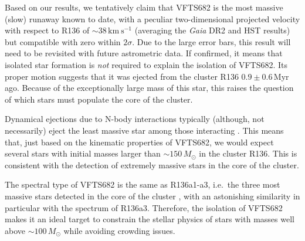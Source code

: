 \documentclass[apjl,twocolumn]{emulateapj}
\newcommand{\kms}{{\,\mathrm{km\ s^{-1}}}}
\begin{document}
Based on our results, we tentatively claim that VFTS682 is the most massive
(slow) runaway known to date, with a peculiar two-dimensional
projected velocity with respect to R136 of
$\sim38\kms$ (averaging the \emph{Gaia} DR2 and HST
results) but compatible with zero within $2\sigma$. Due to the large error bars, this result will need
to be revisited with future astrometric data. %
If confirmed, it means that isolated star formation is
\emph{not} required to explain the isolation of VFTS682. Its proper motion suggests that it was ejected from the cluster R136
$0.9\pm0.6$\,Myr ago. Because of the exceptionally large mass
of this star, this raises the question of which stars must populate
the core of the cluster.

Dynamical ejections due to N-body interactions typically (although, not necessarily) eject the least
massive star among those interacting \cite[e.g.,][]{banerjee:12}. This means that, just
based on the kinematic properties of VFTS682, we would expect several
stars with initial masses larger than $\sim$$150\,M_\odot$ in the
cluster R136.
This is consistent with the detection
of extremely massive stars in the core of the
cluster. %

The spectral type of VFTS682
\citep[WNh5,][]{bestenlehner:11} is the same as R136a1-a3, i.e.~the
three most massive stars detected in the core of the cluster%
, with an astonishing similarity in particular with
the spectrum of R136a3. Therefore, the isolation of
VFTS682 makes it an ideal target to constrain the stellar physics of
stars with masses well above $\sim$$100\,M_\odot$ while avoiding
crowding issues. %
\end{document}
